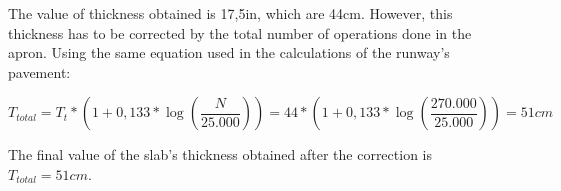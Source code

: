 	The value of thickness obtained is 17,5in, which are 44cm. However, this thickness has to be corrected by the total number of operations done in the apron. Using the same equation used in the calculations of the runway's pavement:
	
	\[T_{total} = T_t * (1+0,133*\log(\dfrac{N}{25.000})) = 44 * (1+0,133*\log(\dfrac{270.000}{25.000}))= 51cm\]
	
	The final value of the slab's thickness obtained after the correction is \(T_{total}=51cm\).